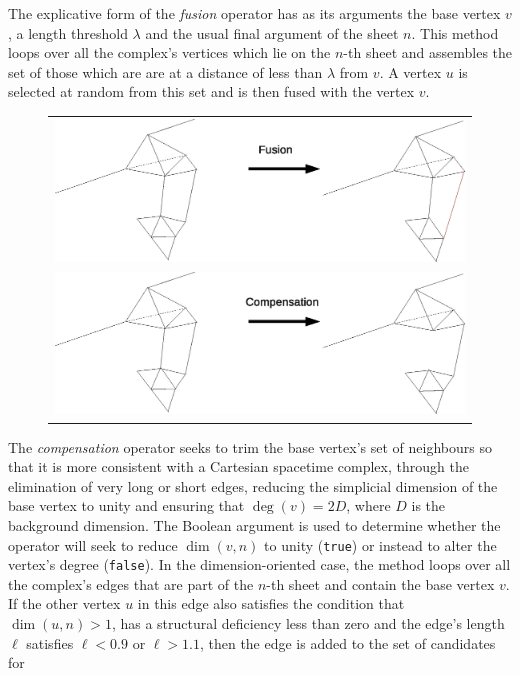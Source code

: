 \documentclass[12pt,letterpaper]{report}
\begin{document}
The explicative form of the \emph{fusion} operator has as its arguments the base vertex $v$, a length threshold 
$\lambda$ and the usual final argument of the sheet $n$. This method loops over all the complex's vertices which 
lie on the $n$-th sheet and assembles the set of those which are are at a distance of less than $\lambda$ from 
$v$. A vertex $u$ is selected at random from this set and is then fused with the vertex $v$.    
\begin{figure}[htp]
\centering
\label{explicative2}
\begin{tabular}{c}
\includegraphics[width=5in]{images/fusion_x.eps} \\
\includegraphics[width=5in]{images/compensation.eps}
\end{tabular}
\end{figure}
The \emph{compensation} operator seeks to trim the base vertex's set of neighbours so that it is more 
consistent with a Cartesian spacetime complex, through the elimination of very long or short edges, reducing 
the simplicial dimension of the base vertex to unity and ensuring that $\deg(v) = 2D$, where $D$ is the 
background dimension. The Boolean argument is used 
to determine whether the operator will seek to reduce $\dim(v,n)$ to unity (\texttt{true}) or instead to alter 
the vertex's degree (\texttt{false}). In the dimension-oriented case, the method loops over all the complex's 
edges that are part of the $n$-th sheet and contain the base vertex $v$. If the other vertex $u$ in this edge 
also satisfies the condition that $\dim(u,n) > 1$, has a structural deficiency less than zero and the edge's 
length $\ell$ satisfies $\ell < 0.9$ or $\ell > 1.1$, then the edge is added to the set of candidates for 
\end{document}
